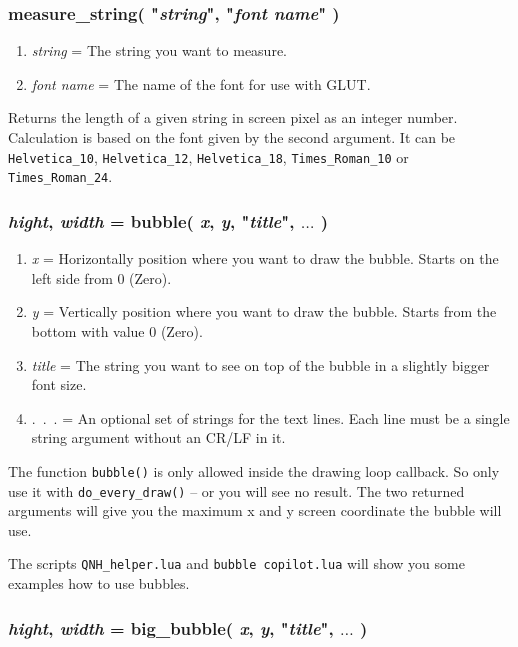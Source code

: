 \documentclass[11pt,parskip=half,a4paper]{scrartcl}
\begin{document}
\subsubsection{measure\_string( "\emph{string}", "\emph{font name}" )}

\begin{enumerate}
	\item \emph{string} = The string you want to measure.
	\item \emph{font name} = The name of the font for use with GLUT.
\end{enumerate}

Returns the length of a given string in screen pixel as an integer number. Calculation is based on the font given by the second argument. It can be \verb|Helvetica_10|, \verb|Helvetica_12|, \verb|Helvetica_18|, \verb|Times_Roman_10| or \verb|Times_Roman_24|.

\subsubsection{\emph{hight}, \emph{width} = bubble( \emph{x}, \emph{y}, "\emph{title}", $\dots$ )}

\begin{enumerate}
	\item \emph{x} = Horizontally position where you want to draw the bubble. Starts on the left side from 0 (Zero).
	\item \emph{y} = Vertically position where you want to draw the bubble. Starts from the bottom with value 0 (Zero).
	\item \emph{title} = The string you want to see on top of the bubble in a slightly bigger font size.
	\item .~.~. = An optional set of strings for the text lines. Each line must be a single string argument without an CR/LF in it.
\end{enumerate}

The function \verb|bubble()| is only allowed inside the drawing loop callback. So only use it with \verb|do_every_draw()| -- or you will see no result. The two returned arguments will give you the maximum x and y screen coordinate the bubble will use.

The scripts \verb|QNH_helper.lua| and \verb|bubble copilot.lua| will show you some examples how to use bubbles.

\subsubsection{\emph{hight}, \emph{width} = big\_bubble( \emph{x}, \emph{y}, "\emph{title}", $\dots$ )}
\end{document}
